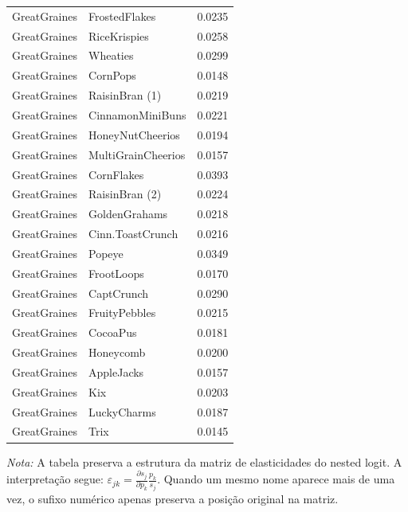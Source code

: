 \begin{table}[H]
\begin{tabular}{llr}
GreatGraines & FrostedFlakes & 0.0235 \\
GreatGraines & RiceKrispies & 0.0258 \\
GreatGraines & Wheaties & 0.0299 \\
GreatGraines & CornPops & 0.0148 \\
GreatGraines & RaisinBran (1) & 0.0219 \\
GreatGraines & CinnamonMiniBuns & 0.0221 \\
GreatGraines & HoneyNutCheerios & 0.0194 \\
GreatGraines & MultiGrainCheerios & 0.0157 \\
GreatGraines & CornFlakes & 0.0393 \\
GreatGraines & RaisinBran (2) & 0.0224 \\
GreatGraines & GoldenGrahams & 0.0218 \\
GreatGraines & Cinn.ToastCrunch & 0.0216 \\
GreatGraines & Popeye & 0.0349 \\
GreatGraines & FrootLoops & 0.0170 \\
GreatGraines & CaptCrunch & 0.0290 \\
GreatGraines & FruityPebbles & 0.0215 \\
GreatGraines & CocoaPus & 0.0181 \\
GreatGraines & Honeycomb & 0.0200 \\
GreatGraines & AppleJacks & 0.0157 \\
GreatGraines & Kix & 0.0203 \\
GreatGraines & LuckyCharms & 0.0187 \\
GreatGraines & Trix & 0.0145 \\
\bottomrule
\end{tabular}

\vspace{0.3em}
\footnotesize
\textit{Nota:} A tabela preserva a estrutura da matriz de elasticidades do nested logit. A interpretação segue: $\varepsilon_{jk}=\frac{\partial s_j}{\partial p_k}\frac{p_k}{s_j}$. Quando um mesmo nome aparece mais de uma vez, o sufixo numérico apenas preserva a posição original na matriz.
\end{table}
\endgroup


